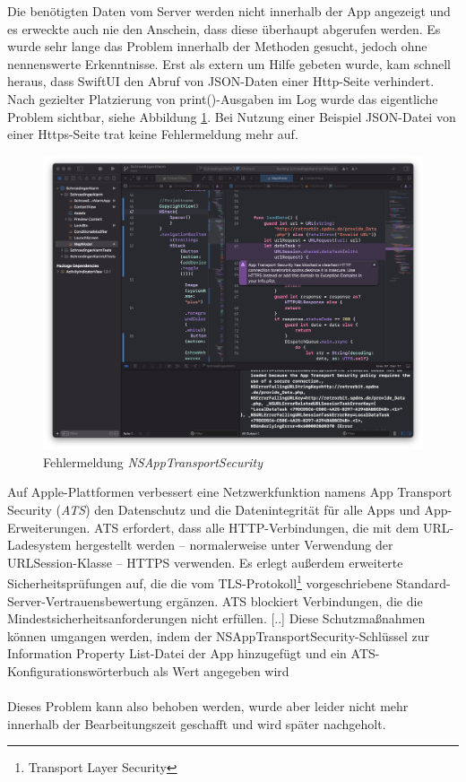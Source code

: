 Die benötigten Daten vom Server werden nicht innerhalb der App angezeigt und es erweckte auch nie den Anschein, dass diese überhaupt abgerufen werden. Es wurde sehr lange das Problem innerhalb der Methoden gesucht, jedoch ohne nennenswerte Erkenntnisse. Erst als extern um Hilfe gebeten wurde, kam schnell heraus, dass SwiftUI den Abruf von JSON-Daten einer Http-Seite verhindert. Nach gezielter Platzierung von print()-Ausgaben im Log wurde das eigentliche Problem sichtbar, siehe Abbildung \ref{fehler}. Bei Nutzung einer Beispiel JSON-Datei von einer Https-Seite trat keine Fehlermeldung mehr auf.
\begin{figure} [H]
	\begin{center}
		\includegraphics[width=1\textwidth]{Bilder/iOS_fehlermeldung.png}
		\caption{Fehlermeldung \textit{NSAppTransportSecurity}}
		\label{fehler}
	\end{center}
\end{figure}
Auf Apple-Plattformen verbessert eine Netzwerkfunktion namens App Transport Security (\textit{ATS}) den Datenschutz und die Datenintegrität für alle Apps und App-Erweiterungen. ATS erfordert, dass alle HTTP-Verbindungen, die mit dem URL-Ladesystem hergestellt werden – normalerweise unter Verwendung der URLSession-Klasse – HTTPS verwenden. Es erlegt außerdem erweiterte Sicherheitsprüfungen auf, die die vom TLS-Protokoll\footnote{Transport Layer Security} vorgeschriebene Standard-Server-Vertrauensbewertung ergänzen. ATS blockiert Verbindungen, die die Mindestsicherheitsanforderungen nicht erfüllen. [..] Diese Schutzmaßnahmen können umgangen werden, indem der NSAppTransportSecurity-Schlüssel zur Information Property List-Datei der App hinzugefügt und ein ATS-Konfigurationswörterbuch als Wert angegeben wird \cite{Inc}
\\
\\
Dieses Problem kann also behoben werden, wurde aber leider nicht mehr innerhalb der Bearbeitungszeit geschafft und wird später nachgeholt.